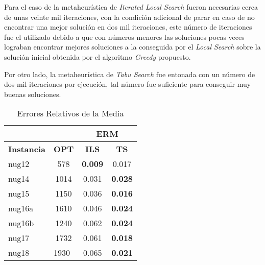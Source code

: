 \documentclass{ci5652}
\begin{document}
Para el caso de la metaheurística de \textit{Iterated Local Search} fueron necesarias cerca de unas veinte mil iteraciones, con la condición adicional de parar en caso de no encontrar una mejor solución en dos mil iteraciones, este número de iteraciones fue el utilizado debido a que con números menores las soluciones pocas veces lograban encontrar mejores soluciones a la conseguida por el \textit{Local Search} sobre la solución inicial obtenida por el algoritmo \textit{Greedy} propuesto.

Por otro lado, la metaheurística de \textit{Tabu Search} fue entonada con un número de dos mil iteraciones por ejecución, tal número fue suficiente para conseguir muy buenas soluciones. 

\begin{table}[ht]
	\label{table:erm}
    \caption{Errores Relativos de la Media}
    \centering
    \begin{tabular}{ll|c|c|}
    \cline{3-4}
                                             & \multicolumn{1}{c|}{\textbf{}}    & \multicolumn{2}{c|}{\textbf{ERM}} \\ \hline
  \multicolumn{1}{|l|}{\textbf{Instancia}} & \multicolumn{1}{c|}{\textbf{OPT}} & \textbf{ILS}                & \textbf{TS}                \\ \hline
  \multicolumn{1}{|l|}{nug12}              & \multicolumn{1}{c|}{578}          & \textbf{0.009}              & 0.017                      \\ \hline
  \multicolumn{1}{|l|}{nug14}              & \multicolumn{1}{c|}{1014}         & 0.031                       & \textbf{0.028}             \\ \hline
  \multicolumn{1}{|l|}{nug15}              & \multicolumn{1}{c|}{1150}         & 0.036                       & \textbf{0.016}             \\ \hline
  \multicolumn{1}{|l|}{nug16a}             & \multicolumn{1}{c|}{1610}         & 0.046                       & \textbf{0.024}             \\ \hline
  \multicolumn{1}{|l|}{nug16b}             & \multicolumn{1}{c|}{1240}         & 0.062                       & \textbf{0.024}             \\ \hline
  \multicolumn{1}{|l|}{nug17}              & \multicolumn{1}{c|}{1732}         & 0.061                       & \textbf{0.018}             \\ \hline
  \multicolumn{1}{|l|}{nug18}              & 1930                              & 0.065                       & \textbf{0.021}             \\ \hline

\end{tabular}
\end{table}
\end{document}
